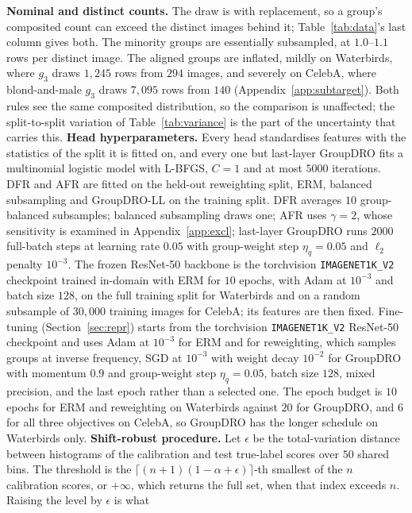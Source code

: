 \documentclass[pdflatex,sn-basic]{sn-jnl}%
\theoremstyle{thmstyleone}%
\begin{document}
\begin{appendices}
\textbf{Nominal and distinct counts.} The draw is with replacement, so a group's composited count
can exceed the distinct images behind it; Table~\ref{tab:data}'s last column gives both. The
minority groups are essentially subsampled, at $1.0$--$1.1$ rows per distinct image. The aligned
groups are inflated, mildly on Waterbirds, where $g_3$ draws $1{,}245$ rows from $294$ images, and
severely on CelebA, where blond-and-male $g_3$ draws $7{,}095$ rows from $140$
(Appendix~\ref{app:subtarget}). Both rules see the same composited distribution, so the comparison
is unaffected; the split-to-split variation of Table~\ref{tab:variance} is the part of the
uncertainty that carries this.
\textbf{Head hyperparameters.} Every head standardises features with the statistics of the split
it is fitted on, and every one but last-layer GroupDRO fits a multinomial logistic model with
L-BFGS, $C=1$ and at most $5000$ iterations. DFR and AFR are fitted on the held-out reweighting
split, ERM, balanced subsampling and GroupDRO-LL on the training split. DFR averages $10$
group-balanced subsamples; balanced subsampling
draws one; AFR uses $\gamma=2$, whose sensitivity is examined in
Appendix~\ref{app:excl}; last-layer GroupDRO runs $2000$ full-batch steps at learning
rate $0.05$ with group-weight step $\eta_q=0.05$ and $\ell_2$ penalty $10^{-3}$. The frozen
ResNet-50 backbone is the torchvision \texttt{IMAGENET1K\_V2} checkpoint trained in-domain with ERM
for $10$ epochs, with Adam at $10^{-3}$ and batch size $128$, on the full training split for
Waterbirds and on a random subsample of $30{,}000$ training images for CelebA; its features are then
fixed. Fine-tuning (Section~\ref{sec:repr}) starts from the torchvision
\texttt{IMAGENET1K\_V2} ResNet-50 checkpoint and uses Adam at
$10^{-3}$ for ERM and for reweighting, which samples groups at inverse frequency, SGD at $10^{-3}$ with weight decay $10^{-2}$ for
GroupDRO with momentum $0.9$ and group-weight step $\eta_q=0.05$, batch size $128$, mixed
precision, and the last epoch rather than a selected one. The epoch budget is $10$ epochs for
ERM and reweighting on Waterbirds against $20$ for GroupDRO, and $6$ for all three objectives on
CelebA, so GroupDRO has the longer schedule on Waterbirds only.
\textbf{Shift-robust procedure.} Let $\epsilon$ be the total-variation distance between
histograms of the calibration and test true-label scores over $50$ shared bins. The threshold is
the $\lceil(n+1)(1-\alpha+\epsilon)\rceil$-th smallest of the $n$ calibration scores, or $+\infty$,
which returns the full set, when that index exceeds $n$. Raising the level by $\epsilon$ is what

\end{appendices}
\end{document}
